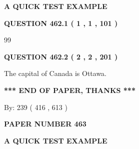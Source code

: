 \documentclass[12pt]{article}
\begin{document}
   
   
   
 \vspace{0.2in}
{\LARGE {\textbf{ A QUICK TEST EXAMPLE}}}
   
   
  
\vspace{0.2in}
  
{\textbf{\Large{QUESTION
462.1 
 ( 1 , 1 , 101 )
}}}
  
  
 
 
\noindent{}

99
 
 
  
\vspace{0.2in}
  
{\textbf{\Large{QUESTION
462.2 
 ( 2 , 2 , 201 )
}}}
  
  
 
 
\noindent{}
 
 
The capital of Canada is Ottawa.
 
 
 
 
   
   
 \vspace{0.2in}
 
   
   
   
   
\vspace{1.0in} 
{\textbf{\large{ *** END OF PAPER, THANKS *** }}} 
   
   
\hspace{1.0in} By: 
 239 ( 416 ,  613 )
   
   
   
   
\newpage 
\setcounter{page}{ 
   463001 } 
   
   
   
   
 {\textbf{ \Large{ PAPER NUMBER  463  }}}
   
   
\vspace{0.2in}
   
   
   
   
   
   
 \vspace{0.2in}
{\LARGE {\textbf{ A QUICK TEST EXAMPLE}}}
   
   
  
\vspace{0.2in}
  
\end{document}
